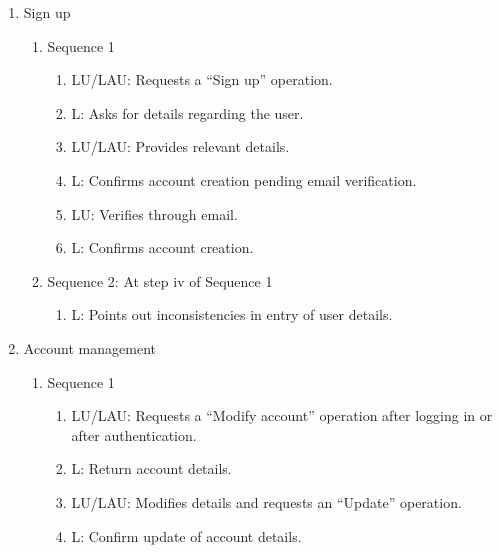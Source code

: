\documentclass[11pt]{report} %
\begin{document}
\begin{enumerate}
\item
	Sign up
		\begin{enumerate}
			\item
				Sequence 1
					\begin{enumerate}
						\item
							LU/LAU: Requests a “Sign up” operation.
						\item
							L: Asks for details regarding the user.
						\item
							LU/LAU: Provides relevant details.
						\item
							L: Confirms account creation pending email verification.
						\item
							LU: Verifies through email.
						\item
							L: Confirms account creation.

					\end{enumerate}
			\item
				Sequence 2: At step iv of Sequence 1
					\begin{enumerate}
						\item
							L: Points out inconsistencies in entry of user details.		
					\end{enumerate}
		\end{enumerate}

\item
	Account management
		\begin{enumerate}
			\item
				Sequence 1
					\begin{enumerate}
						\item
							LU/LAU: Requests a “Modify account” operation after logging in or after authentication.
						\item
							L: Return account details.
						\item
							LU/LAU: Modifies details and requests an “Update” operation.
						\item
							L: Confirm update of account details.						

					\end{enumerate}			
		\end{enumerate}


\end{enumerate}
\end{document}
